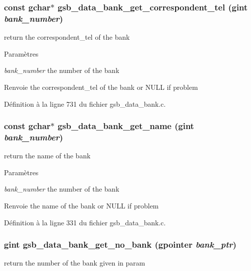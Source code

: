 \subsubsection[{gsb\_\-data\_\-bank\_\-get\_\-correspondent\_\-tel}]{\setlength{\rightskip}{0pt plus 5cm}const gchar$\ast$ gsb\_\-data\_\-bank\_\-get\_\-correspondent\_\-tel (gint {\em bank\_\-number})}\label{gsb__data__bank_8h_a597edbed255d22aa30fbfbf7f85403d9}
return the correspondent\_\-tel of the bank


\begin{DoxyParams}{Paramètres}
\item[{\em bank\_\-number}]the number of the bank\end{DoxyParams}
\begin{DoxyReturn}{Renvoie}
the correspondent\_\-tel of the bank or NULL if problem 
\end{DoxyReturn}


Définition à la ligne 731 du fichier gsb\_\-data\_\-bank.c.

\subsubsection[{gsb\_\-data\_\-bank\_\-get\_\-name}]{\setlength{\rightskip}{0pt plus 5cm}const gchar$\ast$ gsb\_\-data\_\-bank\_\-get\_\-name (gint {\em bank\_\-number})}\label{gsb__data__bank_8h_a81012ac3ba7f570044e23fdf64c20693}
return the name of the bank


\begin{DoxyParams}{Paramètres}
\item[{\em bank\_\-number}]the number of the bank\end{DoxyParams}
\begin{DoxyReturn}{Renvoie}
the name of the bank or NULL if problem 
\end{DoxyReturn}


Définition à la ligne 331 du fichier gsb\_\-data\_\-bank.c.

\subsubsection[{gsb\_\-data\_\-bank\_\-get\_\-no\_\-bank}]{\setlength{\rightskip}{0pt plus 5cm}gint gsb\_\-data\_\-bank\_\-get\_\-no\_\-bank (gpointer {\em bank\_\-ptr})}\label{gsb__data__bank_8h_aeaa802abf5fdc54d005a11ab65a537dc}
return the number of the bank given in param


